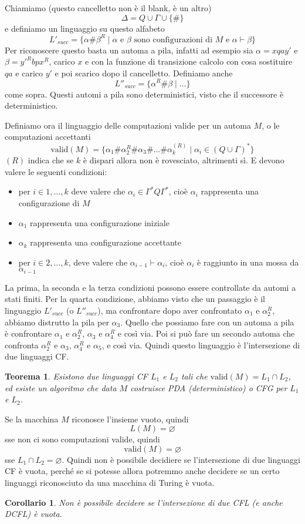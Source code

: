 \documentclass[12pt]{article}
\newtheorem{teorema}{Teorema}
\newtheorem{corollario}{Corollario}
\begin{document}
Chiamiamo (questo cancelletto non è il blank, è un altro)
$$ \Delta = Q \cup \Gamma \cup \{\# \} $$
e definiamo un linguaggio su questo alfabeto
$$ L'_{succ} = \{ \alpha \# \beta^{R} \mid \text{$\alpha$ e $\beta$ sono configurazioni di $M$ e $\alpha \vdash \beta$} \} $$
Per riconoscere questo basta un automa a pila, infatti ad esempio sia $\alpha = xqay'$ e $\beta = y'^Rbpx^R$, carico $x$ e con la funzione di transizione calcolo con cosa sostituire $qa$ e carico $y'$ e poi scarico dopo il cancelletto.
Definiamo anche
$$ L''_{succ} = \{ \alpha^R \# \beta \mid \dots \} $$
come sopra.
Questi automi a pila sono deterministici, visto che il successore è deterministico.

Definiamo ora il linguaggio delle computazioni valide per un automa $M$, o le computazioni accettanti
$$ \text{valid}(M) = \{ \alpha_1 \# \alpha_2^R \# \alpha_3 \# \dots \# \alpha_k^{(R)} \mid \alpha_i \in (Q \cup \Gamma)^* \} $$
$(R)$ indica che se $k$ è dispari allora non è rovesciato, altrimenti sì.
E devono valere le seguenti condizioni:
\begin{itemize}
	\item per $i \in 1, \dots, k$ deve valere che $\alpha_i \in \Gamma^* Q \Gamma^*$, cioè $\alpha_i$ rappresenta una configurazione di $M$
	\item $\alpha_1$ rappresenta una configurazione iniziale
	\item $\alpha_k$ rappresenta una configurazione accettante
	\item per $i \in 2, \dots, k$, deve valere che $\alpha_{i - 1} \vdash \alpha_i$, cioè $\alpha_i$ è raggiunto in una mossa da $\alpha_{i - 1}$
\end{itemize}
La prima, la seconda e la terza condizioni possono essere controllate da automi a stati finiti.
Per la quarta condizione, abbiamo visto che un passaggio è il linguaggio $L'_{succ}$ (o $L''_{succ}$), ma confrontare dopo aver confrontato $\alpha_1$ e $\alpha_2^R$, abbiamo distrutto la pila per $\alpha_3$.
Quello che possiamo fare con un automa a pila è confrontare $\alpha_1$ e $\alpha_2^R$, $\alpha_3$ e $\alpha_4^R$ e così via.
Poi si può fare un secondo automa che confronta $\alpha_2^R$ e $\alpha_3$, $\alpha_4^R$ e $\alpha_5$, e così via.
Quindi questo linguaggio è l'intersezione di due linguaggi CF.

\begin{teorema}
	Esistono due linguaggi CF $L_1$ e $L_2$ tali che $\text{valid}(M) = L_1 \cap L_2$, ed esiste un algoritmo che data $M$ costruisce PDA (deterministico) o CFG per $L_1$ e $L_2$.
\end{teorema}
Se la macchina $M$ riconosce l'insieme vuoto, quindi
$$ L(M) = \varnothing $$
sse non ci sono computazioni valide, quindi
$$ \text{valid}(M) = \varnothing $$
sse $L_1 \cap L_2 = \varnothing$.
Quindi non è possibile decidiere se l'intersezione di due linguaggi CF è vuota, perché se si potesse allora potremmo anche decidere se un certo linguaggi riconosciuto da una macchina di Turing è vuota.
\begin{corollario}
	Non è possibile decidere se l'intersezione di due CFL (e anche DCFL) è vuota.
\end{corollario}
\end{document}
